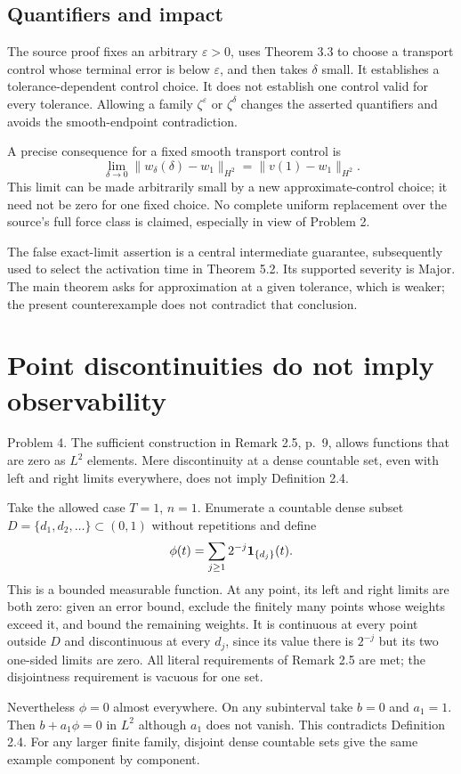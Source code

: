 \documentclass[10pt]{article}
\begin{document}
\subsection*{Quantifiers and impact}
The source proof fixes an arbitrary \(\varepsilon>0\), uses Theorem 3.3 to choose a transport control whose terminal error is below \(\varepsilon\), and then takes \(\delta\) small. It establishes a tolerance-dependent control choice. It does not establish one control valid for every tolerance. Allowing a family \(\zeta^\varepsilon\) or \(\zeta^\delta\) changes the asserted quantifiers and avoids the smooth-endpoint contradiction.\par
A precise consequence for a fixed smooth transport control is \[\lim_{\delta\to0}
 \|w_\delta(\delta)-w_1\|_{H^2}
 =\|v(1)-w_1\|_{H^2}.\] This limit can be made arbitrarily small by a new approximate-control choice; it need not be zero for one fixed choice. No complete uniform replacement over the source’s full force class is claimed, especially in view of Problem 2.\par
The false exact-limit assertion is a central intermediate guarantee, subsequently used to select the activation time in Theorem 5.2. Its supported severity is Major. The main theorem asks for approximation at a given tolerance, which is weaker; the present counterexample does not contradict that conclusion.\par
\section*{Point discontinuities do not imply observability}
Problem 4.  The sufficient construction in Remark 2.5, p. 9, allows functions that are zero as \(L^2\) elements. Mere discontinuity at a dense countable set, even with left and right limits everywhere, does not imply Definition 2.4.\par
Take the allowed case \(T=1\), \(n=1\). Enumerate a countable dense subset \(D=\{d_1,d_2,\ldots\}\subset(0,1)\) without repetitions and define \[\phi(t)=\sum_{j\ge1}2^{-j}{\bf1}_{\{d_j\}}(t).\] This is a bounded measurable function. At any point, its left and right limits are both zero: given an error bound, exclude the finitely many points whose weights exceed it, and bound the remaining weights. It is continuous at every point outside \(D\) and discontinuous at every \(d_j\), since its value there is \(2^{-j}\) but its two one-sided limits are zero. All literal requirements of Remark 2.5 are met; the disjointness requirement is vacuous for one set.\par
Nevertheless \(\phi=0\) almost everywhere. On any subinterval take \(b=0\) and \(a_1=1\). Then \(b+a_1\phi=0\) in \(L^2\) although \(a_1\) does not vanish. This contradicts Definition 2.4. For any larger finite family, disjoint dense countable sets give the same example component by component.\par
\end{document}
